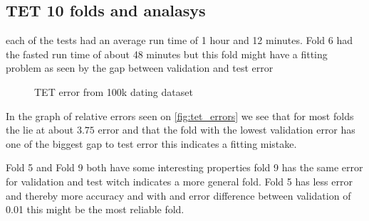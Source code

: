 \subsection{TET 10 folds and analasys}
each of the tests had an average run time of 1 hour and 12 minutes.  Fold 6 had the fasted run time of about 48 minutes but this fold might have a fitting problem as seen by the gap between validation and test error

\begin{figure}[H]
	\centering
	\begin{adjustbox}{width=0.5\textwidth}
		
	\end{adjustbox}
	\caption{TET error from 100k dating dataset }
	\label{fig:tet_errors}
\end{figure}

In the graph of relative errors seen on \autoref{fig:tet_errors} we see that for most folds the lie at about $3.75$ error and that the fold with the lowest validation error has one of the biggest gap to test error this indicates a fitting mistake. 

Fold 5 and Fold 9 both have some interesting properties fold 9 has the same error for validation and test witch indicates a more general fold. Fold 5 has less error and thereby more accuracy and with and error difference between validation of 0.01 this might be the most reliable fold.